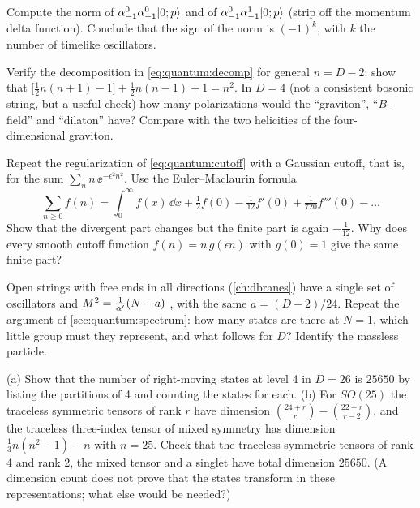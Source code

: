 \begin{exercise}[$\star$]
Compute the norm of $\alpha^0_{-1}\alpha^0_{-1}|0;p\rangle$ and of
$\alpha^0_{-1}\alpha^1_{-1}|0;p\rangle$ (strip off the momentum delta function). Conclude that
the sign of the norm is $(-1)^{k}$, with $k$ the number of timelike oscillators.
\end{exercise}

\begin{exercise}[$\star$]
Verify the decomposition in \cref{eq:quantum:decomp} for general $n=D-2$: show that
$\big[\frac12n(n+1)-1\big]+\frac12n(n-1)+1=n^2$. In $D=4$ (not a consistent bosonic string,
but a useful check) how many polarizations would the ``graviton'', ``$B$-field'' and
``dilaton'' have? Compare with the two helicities of the four-dimensional graviton.
\end{exercise}

\begin{exercise}[$\star\star$]
Repeat the regularization of \cref{eq:quantum:cutoff} with a Gaussian cutoff, that is, for
the sum $\sum_nn\,\ee^{-\epsilon^2n^2}$. Use the Euler--Maclaurin formula
\[
 \sum_{n\ge0}f(n)=\int_0^\infty f(x)\,\dd x+\tfrac12f(0)-\tfrac1{12}f'(0)+\tfrac1{720}f'''(0)-\dots
\]
Show that the
divergent part changes but the finite part is again $-\frac1{12}$. Why does every smooth
cutoff function $f(n)=n\,g(\epsilon n)$ with $g(0)=1$ give the same finite part?
\end{exercise}

\begin{exercise}[$\star\star$]
Open strings with free ends in all directions (\cref{ch:dbranes}) have a single set of
oscillators and $M^2=\frac1{\alpha'}(N-a)$ , with the same
$a=(D-2)/24$. Repeat the argument of
\cref{sec:quantum:spectrum}: how many states are there at $N=1$, which little group must they
represent, and what follows for $D$? Identify the massless particle.
\end{exercise}

\begin{exercise}[$\star\star$]
(a) Show that the number of right-moving states at level 4 in $D=26$ is $25650$ by listing
the partitions of 4 and counting the states for each. (b) For $SO(25)$ the traceless
symmetric tensors of rank $r$ have dimension $\binom{24+r}{r}-\binom{22+r}{r-2}$, and the
traceless three-index tensor of mixed symmetry has dimension $\frac13n(n^2-1)-n$ with
$n=25$. Check that the traceless symmetric tensors of rank 4 and rank 2, the mixed tensor
and a singlet have total dimension $25650$. (A dimension count does not prove that the states
transform in these representations; what else would be needed?)
\end{exercise}

